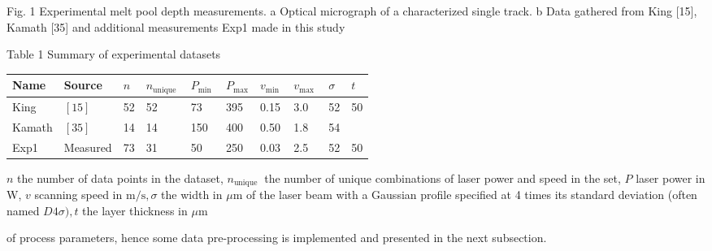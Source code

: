 \documentclass[10pt]{article}
\begin{document}
Fig. 1 Experimental melt pool depth measurements. a Optical micrograph of a characterized single track. b Data gathered from King [15], Kamath [35] and additional measurements Exp1 made in this study

Table 1 Summary of experimental datasets

\begin{center}
\begin{tabular}{llllllllll}
\hline
Name & Source & $n$ & $n_{\text {unique }}$ & $P_{\text {min }}$ & $P_{\max }$ & $v_{\text {min }}$ & $v_{\text {max }}$ & $\sigma$ & $t$ \\
\hline
King & $[15]$ & 52 & 52 & 73 & 395 & 0.15 & 3.0 & 52 & 50 \\
Kamath & $[35]$ & 14 & 14 & 150 & 400 & 0.50 & 1.8 & 54 &  \\
Exp1 & Measured & 73 & 31 & 50 & 250 & 0.03 & 2.5 & 52 & 50 \\
\hline
\end{tabular}
\end{center}

$n$ the number of data points in the dataset, $n_{\text {unique }}$ the number of unique combinations of laser power and speed in the set, $P$ laser power in W, $v$ scanning speed in $\mathrm{m} / \mathrm{s}, \sigma$ the width in $\mu \mathrm{m}$ of the laser beam with a Gaussian profile specified at 4 times its standard deviation (often named $D 4 \sigma), t$ the layer thickness in $\mu \mathrm{m}$

of process parameters, hence some data pre-processing is implemented and presented in the next subsection.
\end{document}
